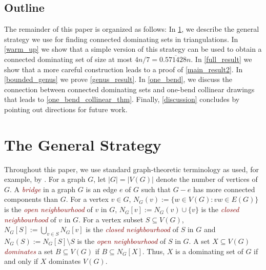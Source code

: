\documentclass[11pt]{article}
\newcommand{\pat}[1]{\textcolor{red}{PM: #1}}
\newcommand{\defin}[1]{\emph{\textcolor{Maroon}{#1}}}
\theoremstyle{definition}
\begin{document}

\subsection{Outline}

The remainder of this paper is organized as follows:  In \cref{strategy}, we describe the general strategy we use for finding connected dominating sets in triangulations.  In \cref{warm_up} we show that a simple version of this strategy can be used to obtain a connected dominating set of size at most $4n/7= 0.\overline{571428}n$.
In \cref{full_result} we show that a more careful construction leads to a proof of \cref{main_result2}.  In \cref{bounded_genus} we prove \cref{genus_result}.  In \cref{one_bend}, we discuss the connection between connected dominating sets and one-bend collinear drawings that leads to \cref{one_bend_collinear_thm}.  Finally, \cref{discussion} concludes by pointing out directions for future work.



%


\section{The General Strategy}
\label{strategy}

Throughout this paper, we use standard graph-theoretic terminology as used, for example, by \citet{diestel:graph}.
For a graph $G$, let $|G|=|V(G)|$ denote the number of vertices of $G$.  A \defin{bridge} in a graph $G$ is an edge $e$ of $G$ such that $G-e$ has more connected components than $G$.  For a vertex $v\in G$, $N_G(v):=\{w\in V(G):vw\in E(G)\}$ is the \defin{open neighbourhood} of $v$ in $G$,  $N_G[v]:=N_G(v)\cup\{v\}$ is the \defin{closed neighbourhood} of $v$ in $G$.  For a vertex subset $S\subseteq V(G)$, $N_G[S]:=\bigcup_{v\in S} N_{G}[v]$ is the \defin{closed neighbourhood} of $S$ in $G$ and $N_G(S):=N_G[S]\setminus S$ is the \defin{open neighbourhood} of $S$ in $G$.  A set $X\subseteq V(G)$ \defin{dominates} a set $B\subseteq V(G)$ if $B\subseteq N_G[X]$.  Thus, $X$ is a dominating set of $G$ if and only if $X$ dominates $V(G)$.
\end{document}
